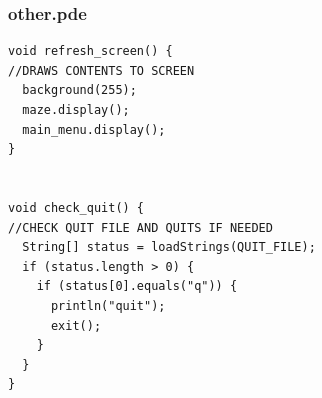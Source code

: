\documentclass[titlepage]{article}
\begin{document}
\pagebreak
\subsubsection{other.pde}
\begin{changemargin}{-1in}{-1in} 
\begin{verbatim}
void refresh_screen() {                                                            //DRAWS CONTENTS TO SCREEN
  background(255);
  maze.display();
  main_menu.display();
}


void check_quit() {                                                                //CHECK QUIT FILE AND QUITS IF NEEDED
  String[] status = loadStrings(QUIT_FILE);
  if (status.length > 0) {
    if (status[0].equals("q")) {
      println("quit");
      exit();
    }
  }
}
\end{verbatim}
\end{changemargin} 


\pagebreak
\end{document}
